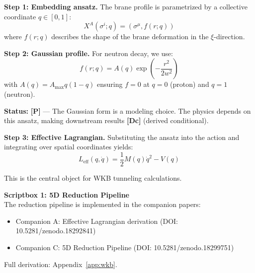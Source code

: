 \documentclass[11pt,a4paper]{article}
\newcommand{\tagP}{\textcolor{red!70!black}{\textbf{[P]}}}
\newcommand{\tagDc}{\textcolor{blue!70!black}{\textbf{[Dc]}}}
\begin{document}
\begin{center}
\end{center}

\textbf{Step 1: Embedding ansatz.} The brane profile is parametrized by a collective coordinate $q \in [0,1]$:
\begin{equation}
    X^A(\sigma^i; q) = (\sigma^\mu, f(r; q))
\end{equation}
where $f(r; q)$ describes the shape of the brane deformation in the $\xi$-direction.

\textbf{Step 2: Gaussian profile.} For neutron decay, we use:
\begin{equation}
    f(r; q) = A(q) \exp\left( -\frac{r^2}{2w^2} \right)
    \label{eq:gaussian_profile}
\end{equation}
with $A(q) = A_{\max} q(1-q)$ ensuring $f = 0$ at $q = 0$ (proton) and $q = 1$ (neutron).

\textbf{Status:} \tagP{} --- The Gaussian form is a modeling choice. The physics depends on this ansatz, making downstream results \tagDc{} (derived conditional).

\textbf{Step 3: Effective Lagrangian.} Substituting the ansatz into the action and integrating over spatial coordinates yields:
\begin{equation}
    L_{\text{eff}}(q, \dot{q}) = \frac{1}{2} M(q) \dot{q}^2 - V(q)
    \label{eq:L_eff}
\end{equation}

This is the central object for WKB tunneling calculations.

\begin{scriptbox}
\textbf{Scriptbox 1: 5D Reduction Pipeline}\\
The reduction pipeline is implemented in the companion papers:
\begin{itemize}[nosep]
    \item Companion A: Effective Lagrangian derivation (DOI: 10.5281/zenodo.18292841)
    \item Companion C: 5D Reduction Pipeline (DOI: 10.5281/zenodo.18299751)
\end{itemize}
Full derivation: Appendix~\ref{app:wkb}.
\end{scriptbox}
\label{sb:reduction}
\end{document}

